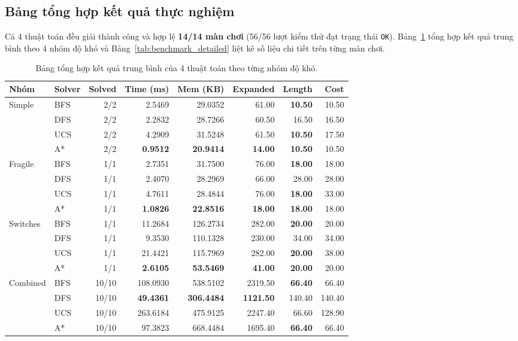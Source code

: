 \documentclass[12pt,a4paper]{article}
\begin{document}
\subsection{Bảng tổng hợp kết quả thực nghiệm}
Cả 4 thuật toán đều giải thành công và hợp lệ \textbf{14/14 màn chơi} (56/56 lượt kiểm thử đạt trạng thái \texttt{OK}). Bảng~\ref{tab:benchmark_summary} tổng hợp kết quả trung bình theo 4 nhóm độ khó và Bảng~\ref{tab:benchmark_detailed} liệt kê số liệu chi tiết trên từng màn chơi.

\begin{table}[H]
\centering
\small
\setlength{\tabcolsep}{0pt}
\renewcommand{\arraystretch}{1.2}
\begin{tabular*}{\textwidth}{@{\extracolsep{\fill}}llrrrrrr@{}}
\toprule
\textbf{Nhóm} & \textbf{Solver} & \textbf{Solved} & \textbf{Time (ms)} & \textbf{Mem (KB)} & \textbf{Expanded} & \textbf{Length} & \textbf{Cost} \\
\midrule
Simple   & BFS & 2/2 & 2.5469 & 29.0352 & 61.00 & \textbf{10.50} & 10.50 \\
         & DFS & 2/2 & 2.2832 & 28.7266 & 60.50 & 16.50 & 16.50 \\
         & UCS & 2/2 & 4.2909 & 31.5248 & 61.50 & \textbf{10.50} & 17.50 \\
         & A*  & 2/2 & \textbf{0.9512} & \textbf{20.9414} & \textbf{14.00} & \textbf{10.50} & 10.50 \\
\midrule
Fragile  & BFS & 1/1 & 2.7351 & 31.7500 & 76.00 & \textbf{18.00} & 18.00 \\
         & DFS & 1/1 & 2.4070 & 28.2969 & 66.00 & 28.00 & 28.00 \\
         & UCS & 1/1 & 4.7611 & 28.4844 & 76.00 & \textbf{18.00} & 33.00 \\
         & A*  & 1/1 & \textbf{1.0826} & \textbf{22.8516} & \textbf{18.00} & \textbf{18.00} & 18.00 \\
\midrule
Switches & BFS & 1/1 & 11.2684 & 126.2734 & 282.00 & \textbf{20.00} & 20.00 \\
         & DFS & 1/1 & 9.3530 & 110.1328 & 230.00 & 34.00 & 34.00 \\
         & UCS & 1/1 & 21.4421 & 115.7969 & 282.00 & \textbf{20.00} & 38.00 \\
         & A*  & 1/1 & \textbf{2.6105} & \textbf{53.5469} & \textbf{41.00} & \textbf{20.00} & 20.00 \\
\midrule
Combined & BFS & 10/10 & 108.0930 & 538.5102 & 2319.50 & \textbf{66.40} & 66.40 \\
         & DFS & 10/10 & \textbf{49.4361} & \textbf{306.4484} & \textbf{1121.50} & 140.40 & 140.40 \\
         & UCS & 10/10 & 263.6184 & 475.9125 & 2247.40 & 66.60 & 128.90 \\
         & A*  & 10/10 & 97.3823 & 668.4484 & 1695.40 & \textbf{66.40} & 66.40 \\
\bottomrule
\end{tabular*}
\caption{Bảng tổng hợp kết quả trung bình của 4 thuật toán theo từng nhóm độ khó.}
\label{tab:benchmark_summary}
\end{table}
\end{document}
